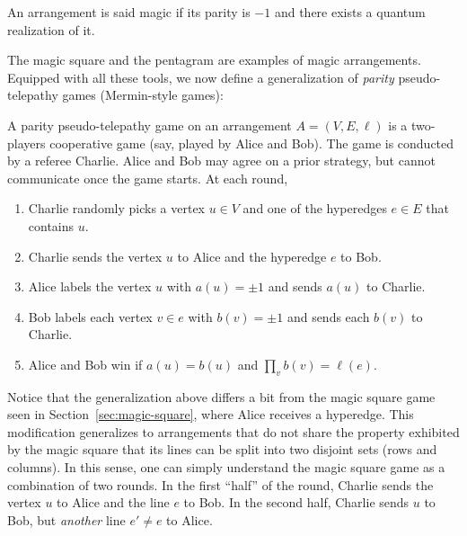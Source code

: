 \documentclass{llncs}
\begin{document}
\begin{definition}\label{def:magic-arr}
  An arrangement is said magic if its parity is \(-1\) and there exists
  a quantum realization of it.
\end{definition}

The magic square and the pentagram are examples of magic arrangements.
Equipped with all these tools, we now define a generalization of \emph{parity}
pseudo-telepathy games (Mermin-style games):

\begin{definition}\label{def:parity-game}
  A parity pseudo-telepathy game on an arrangement \(A = (V, E, \ell)\) is
  a two-players cooperative game (say, played by Alice and Bob). The
  game is conducted by a referee Charlie. Alice and Bob may agree on a
  prior strategy, but cannot communicate once the game starts. At each
  round,
  \begin{enumerate}
  \item Charlie randomly picks a vertex \(u \in V\) and one of the hyperedges
    \(e \in E\) that contains \(u\).
    
  \item Charlie sends the vertex \(u\) to Alice and the hyperedge \(e\) to Bob.
    
  \item Alice labels the vertex \(u\) with \(a(u) = \pm{}1\) and sends
    \(a(u)\) to Charlie.

  \item Bob labels each vertex \(v \in e\) with \(b(v) = \pm{}1\) and sends
    each \(b(v)\) to Charlie.
    
  \item Alice and Bob win if \(a(u) = b(u)\) and \(\prod_{v} b(v) = \ell(e)\).
  \end{enumerate}
\end{definition}

Notice that the generalization above differs a bit from the magic
square game seen in Section~\ref{sec:magic-square}, where Alice
receives a hyperedge. This modification generalizes to
arrangements that do not share the property exhibited by the magic
square that its lines can be split into two disjoint sets (rows and
columns). In this sense, one can simply understand the magic square
game as a combination of two rounds. In the first ``half'' of the
round, Charlie sends the vertex \(u\) to Alice and the line \(e\) to
Bob. In the second half, Charlie sends \(u\) to Bob, but
\emph{another} line \(e' \neq e\) to Alice.
\end{document}
